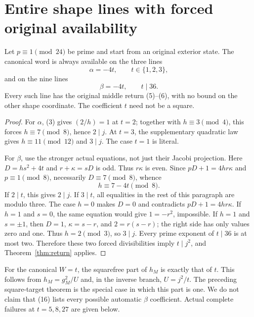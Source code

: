 \section{Entire shape lines with forced original availability}
\begin{theorem}\label{thm:auto}
Let $p\equiv1\pmod{24}$ be prime and start from an original exterior state.
The canonical word is always available on the three lines
\[
 \alpha=-4t,\qquad t\in\{1,2,3\},
\]
and on the nine lines
\[
 \boxed{\beta=-4t,\qquad t\mid36.}                      \tag{16}
\]
Every such line has the original middle return (5)--(6), with no bound on the
other shape coordinate. The coefficient $t$ need not be a square.
\end{theorem}
\begin{proof}
For $\alpha$, (3) gives $(2/h)=1$ at $t=2$; together with $h\equiv3\pmod4$,
this forces $h\equiv7\pmod8$, hence $2\mid j$. At $t=3$, the supplementary
quadratic law gives $h\equiv11\pmod{12}$ and $3\mid j$. The case $t=1$ is literal.

For $\beta$, use the stronger actual equations, not just their Jacobi projection.
Here $D=hs^2+4t$ and $r+\kappa=sD$ is odd. Thus $r\kappa$ is even. Since
$pD+1=4hr\kappa$ and $p\equiv1\pmod8$, necessarily $D\equiv7\pmod8$, whence
\[
 h\equiv7-4t\pmod8.
\]
If $2\mid t$, this gives $2\mid j$.
If $3\mid t$, all equalities in the rest of this paragraph are modulo three.
The case $h=0$ makes $D=0$ and contradicts
$pD+1=4hr\kappa$. If $h=1$ and $s=0$, the same equation would give
$1=-r^2$, impossible. If $h=1$ and $s=\pm1$, then $D=1$, $\kappa=s-r$, and
$2=r(s-r)$; the right side has only values zero and one. Thus $h=2\pmod3$,
so $3\mid j$. Every prime exponent of $t\mid36$ is at most two. Therefore
these two forced divisibilities imply $t\mid j^2$, and Theorem~\ref{thm:return}
applies.
\end{proof}

For the canonical $W=t$, the squarefree part of $h_M$ is exactly that of $t$.
This follows from $h_M=g_M^2/U$ and, in the inverse branch, $U=j^2/t$.
The preceding square-target theorem is the special case in which this part is one.
We do not claim that (16) lists every possible automatic $\beta$ coefficient.
Actual complete failures at $t=5,8,27$ are given below.

